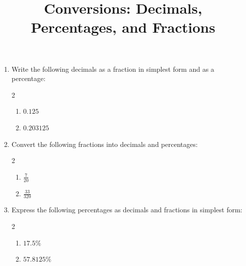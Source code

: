 \documentclass[12pt]{article}
\begin{document}

\title{Conversions: Decimals, Percentages, and Fractions}
\date{}
\maketitle

\begin{enumerate}[label=\textbf{Q\arabic*.}]


\item Write the following decimals as a fraction in simplest form and as a percentage:
\begin{multicols}{2}
\begin{enumerate}[label=(\alph*)]
    \item \( 0.125 \)
    \item \( 0.203125 \)
\end{enumerate}
\end{multicols}


\item Convert the following fractions into decimals and percentages:
\begin{multicols}{2}
\begin{enumerate}[label=(\alph*)]
    \item \( \frac{7}{20} \)
    \item \( \frac{33}{320} \)
\end{enumerate}
\end{multicols}

\item Express the following percentages as decimals and fractions in simplest form:
\begin{multicols}{2}
\begin{enumerate}[label=(\alph*)]
    \item \( 17.5\% \)
    \item \( 57.8125\% \)
\end{enumerate}
\end{multicols}

\end{enumerate}


\bigskip
\end{document}

